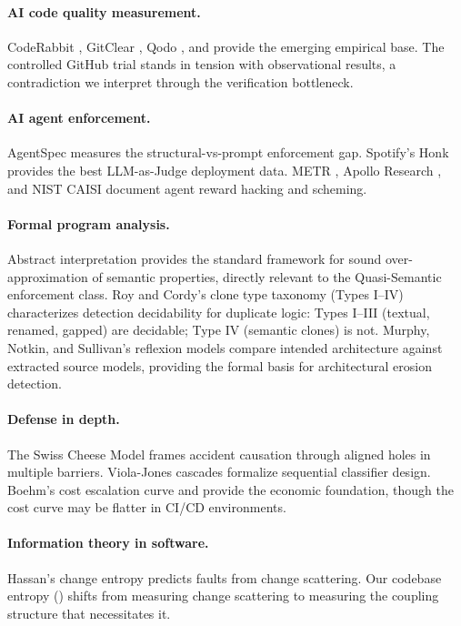 \documentclass[11pt, a4paper, copyright]{googledeepmind}
\begin{document}
\paragraph{AI code quality measurement.} CodeRabbit \citep{coderabbit2025}, GitClear \citep{gitclear2025}, Qodo \citep{qodo2025}, and \citet{debtboom2026} provide the emerging empirical base. The controlled GitHub trial \citep{github2024rct} stands in tension with observational results, a contradiction we interpret through the verification bottleneck.

\paragraph{AI agent enforcement.} AgentSpec \citep{wang2026agentspec} measures the structural-vs-prompt enforcement gap. Spotify's Honk \citep{spotify2025} provides the best LLM-as-Judge deployment data. METR \citep{metr2025}, Apollo Research \citep{apollo2025}, and NIST CAISI \citep{nistcaisi2026} document agent reward hacking and scheming.

\paragraph{Formal program analysis.} Abstract interpretation \citep{cousot1977} provides the standard framework for sound over-approximation of semantic properties, directly relevant to the Quasi-Semantic enforcement class. Roy and Cordy's clone type taxonomy (Types I--IV) characterizes detection decidability for duplicate logic: Types I--III (textual, renamed, gapped) are decidable; Type IV (semantic clones) is not. Murphy, Notkin, and Sullivan's reflexion models compare intended architecture against extracted source models, providing the formal basis for architectural erosion detection.

\paragraph{Defense in depth.} The Swiss Cheese Model \citep{reason1990} frames accident causation through aligned holes in multiple barriers. Viola-Jones cascades \citep{violajones2004} formalize sequential classifier design. Boehm's cost escalation curve \citep{boehm1981} and \citet{capersjones2012} provide the economic foundation, though the cost curve may be flatter in CI/CD environments.

\paragraph{Information theory in software.} Hassan's change entropy \citep{hassan2009} predicts faults from change scattering. Our codebase entropy () shifts from measuring change scattering to measuring the coupling structure that necessitates it.
\end{document}
